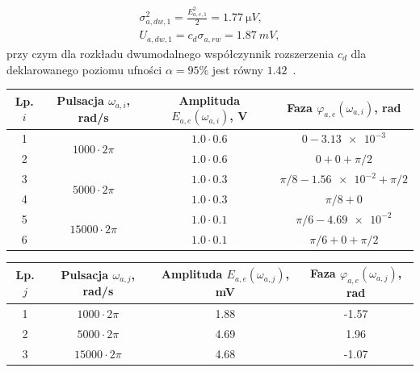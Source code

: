 \begin{gather}
\sigma_{a,dw,1}^{2} = \frac{E_{a,e,1}^{2}}{2} = \qty{1.77}{\micro V} \label{eq:sym_parta_dyn_self_var}, \\
U_{a,dw,1} = c_{d} \sigma_{a,rw} = \qty{1.87}{mV} \label{eq:sym_parta_dyn_self_unc},
\end{gather}
przy czym dla rozkładu dwumodalnego współczynnik rozszerzenia $c_{d}$ dla deklarowanego poziomu ufności $\alpha = 95\%$ jest równy $1.42$~\cite{jakubiec_system}.

\begin{table}[htb!]
\begin{center}
\begin{tabular}[c]{| c | c | c | c |} \hline
\textbf{Lp. $i$} & \textbf{Pulsacja $\omega_{a,i}$, rad/s} & \textbf{Amplituda $E_{a,e}(\omega_{a,i})$, V} & \textbf{Faza $\varphi_{a,e}(\omega_{a,i})$, rad} \\ \hline
1 & \multirow{2}{*}{$1000  \cdot 2\pi$} &  $1.0 \cdot 0.6$       & $0 - \num{3.13e-3}$              \\ \cline{1-1} \cline{3-4}
2 &                                     &  $1.0 \cdot 0.6$       & $0 + 0 + \pi/2$                  \\ \hline
3 & \multirow{2}{*}{$5000  \cdot 2\pi$} &  $1.0 \cdot 0.3$       & $\pi/8 - \num{1.56e-2} + \pi/2$  \\ \cline{1-1} \cline{3-4}
4 &                                     &  $1.0 \cdot 0.3$       & $\pi/8 + 0$                      \\ \hline
5 & \multirow{2}{*}{$15000 \cdot 2\pi$} &  $1.0 \cdot 0.1$       & $\pi/6 - \num{4.69e-2}$          \\ \cline{1-1} \cline{3-4}
6 &                                     &  $1.0 \cdot 0.1$       & $\pi/6 + 0 + \pi/2$              \\ \hline
\end{tabular}
\end{center}
\end{table}

\begin{table}[htb!]
\begin{center}
\begin{tabular}[c]{| c | c | S[table-format = 1.2] | S[table-format = +1.2] |} \hline
\textbf{Lp. $j$} & \textbf{Pulsacja $\omega_{a,j}$, rad/s} & \textbf{Amplituda $E_{a,e}(\omega_{a,j})$, mV} & \textbf{Faza $\varphi_{a,e}(\omega_{a,j})$, rad} \\  & $1000  \cdot 2\pi$  &  1.88  & -1.57  \\  & $5000  \cdot 2\pi$  &  4.69  &  1.96  \\  & $15000 \cdot 2\pi$  &  4.68  & -1.07  \\ \hline
\end{tabular}
\end{center}
\end{table}

